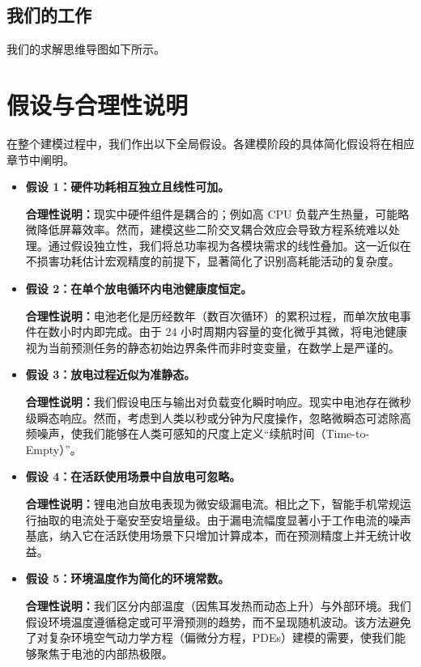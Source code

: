 \documentclass[11pt,a4paper]{ctexart}
\begin{document}
\subsection{我们的工作}

我们的求解思维导图如下所示。

\section{假设与合理性说明}

在整个建模过程中，我们作出以下全局假设。各建模阶段的具体简化假设将在相应章节中阐明。

\begin{itemize}[leftmargin=2em]
\item \textbf{假设 1：硬件功耗相互独立且线性可加。}

\textbf{合理性说明：}现实中硬件组件是耦合的；例如高 CPU 负载产生热量，可能略微降低屏幕效率。然而，建模这些二阶交叉耦合效应会导致方程系统难以处理。通过假设独立性，我们将总功率视为各模块需求的线性叠加。这一近似在不损害功耗估计宏观精度的前提下，显著简化了识别高耗能活动的复杂度。

\item \textbf{假设 2：在单个放电循环内电池健康度恒定。}

\textbf{合理性说明：}电池老化是历经数年（数百次循环）的累积过程，而单次放电事件在数小时内即完成。由于 24 小时周期内容量的变化微乎其微，将电池健康视为当前预测任务的静态初始边界条件而非时变变量，在数学上是严谨的。

\item \textbf{假设 3：放电过程近似为准静态。}

\textbf{合理性说明：}我们假设电压与输出对负载变化瞬时响应。现实中电池存在微秒级瞬态响应。然而，考虑到人类以秒或分钟为尺度操作，忽略微瞬态可滤除高频噪声，使我们能够在人类可感知的尺度上定义“续航时间（Time-to-Empty）”。

\item \textbf{假设 4：在活跃使用场景中自放电可忽略。}

\textbf{合理性说明：}锂电池自放电表现为微安级漏电流。相比之下，智能手机常规运行抽取的电流处于毫安至安培量级。由于漏电流幅度显著小于工作电流的噪声基底，纳入它在活跃使用场景下只增加计算成本，而在预测精度上并无统计收益。

\item \textbf{假设 5：环境温度作为简化的环境常数。}

\textbf{合理性说明：}我们区分内部温度（因焦耳发热而动态上升）与外部环境。我们假设环境温度遵循稳定或可平滑预测的趋势，而不呈现随机波动。该方法避免了对复杂环境空气动力学方程（偏微分方程，PDEs）建模的需要，使我们能够聚焦于电池的内部热极限。
\end{itemize}
\end{document}

